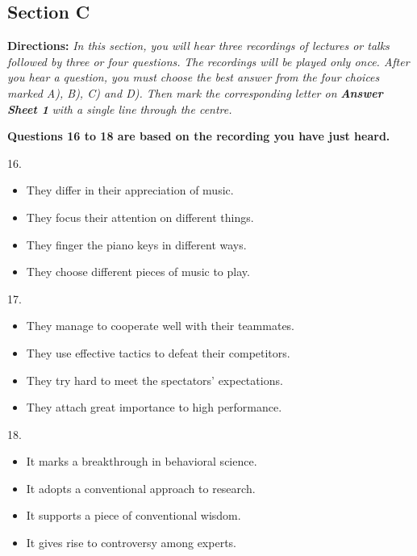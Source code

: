 \documentclass[UTF8,11pt]{ctexart}
\begin{document}
\subsection*{\textbf{Section C}}


\textbf{Directions:}\textit{ In this section, you will hear three recordings of lectures or talks followed by three or four questions.} \textit{The recordings will be played only once. After you hear a question, you must choose the best answer from the four} \textit{choices marked A), B), C) and D). Then mark the corresponding letter on}\textbf{\textit{ Answer Sheet 1}}\textit{ with a single line} \textit{through the centre.}


\textbf{Questions 16 to 18 are based on the recording you have just heard.}


16.


\begin{itemize}[leftmargin=2em,itemsep=.2em,topsep=.4em]\item[A.] They differ in their appreciation of music.
\item[B.] They focus their attention on different things.
\item[C.] They finger the piano keys in different ways.
\item[D.] They choose different pieces of music to play.
\end{itemize}

17.


\begin{itemize}[leftmargin=2em,itemsep=.2em,topsep=.4em]\item[A.] They manage to cooperate well with their teammates.
\item[B.] They use effective tactics to defeat their competitors.
\item[C.] They try hard to meet the spectators’ expectations.
\item[D.] They attach great importance to high performance.
\end{itemize}

18.


\begin{itemize}[leftmargin=2em,itemsep=.2em,topsep=.4em]\item[A.] It marks a breakthrough in behavioral science.
\item[B.] It adopts a conventional approach to research.
\item[C.] It supports a piece of conventional wisdom.
\item[D.] It gives rise to controversy among experts.
\end{itemize}
\end{document}
